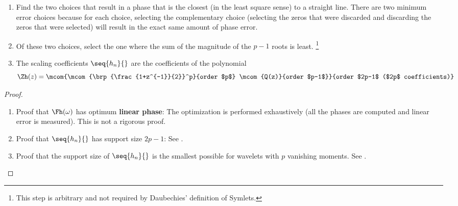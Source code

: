 \begin{enumerate}
  \item Find the two choices that result in a phase that is the
        closest (in the least square sense) to a straight line.
        There are two minimum error choices because for each choice,
        selecting the complementary choice
        (selecting the zeros that were discarded and discarding
        the zeros that were selected)
        will result in the exact same amount of phase error.\\

  \item Of these two choices, select the one where the sum of the magnitude
        of the $p-1$ roots is least.
        \footnote{This step is arbitrary and not required by
        Daubechies' definition of Symlets.}

  \item The scaling coefficients $\seq{h_n}{}$ are the coefficients of
        the polynomial
        \[ \Zh(z) = \mcom{\mcom{\brp{\frac{1+z^{-1}}{2}}^p}{order $p$} \mcom{Q(z)}{order $p-1$}}
                         {order $2p-1$ ($2p$ coefficients)} 
        \]
\end{enumerate}



\begin{theorem}
\end{theorem}
\begin{proof}
\begin{enumerate}
\item Proof that $\Fh(\omega)$ has optimum {\bf linear phase}:
      The optimization is performed exhaustively
      (all the phases are computed and linear error is measured).
      This is not a rigorous proof.  \problem

\item Proof that $\seq{h_n}{}$ has support size $2p-1$:
      See  .

\item Proof that the support size of $\seq{h_n}{}$ is the smallest possible for wavelets with $p$ vanishing moments.
      See  .
\end{enumerate}
\end{proof}




